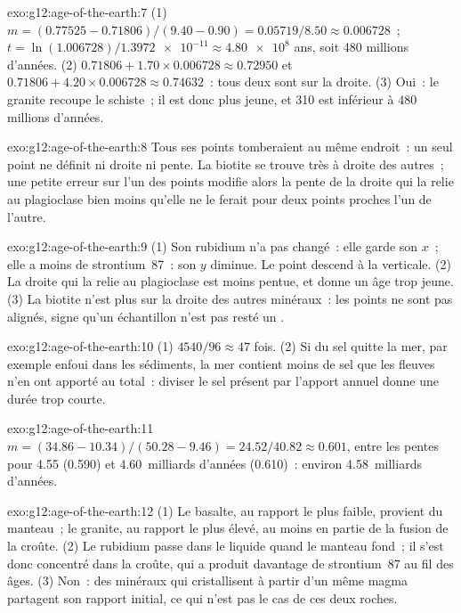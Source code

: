 \begin{solution}{exo:g12:age-of-the-earth:7}
(1) $m = (0.77525 - 0.71806)/(9.40 - 0.90) = 0.05719/8.50 \approx 0.006728$~;
$t = \ln(1.006728)/\num{1.3972e-11} \approx \num{4.80e8}$ ans, soit 480
millions d'années. (2) $0.71806 + 1.70 \times 0.006728 \approx 0.72950$ et $0.71806 + 4.20
\times 0.006728 \approx 0.74632$~: tous deux sont sur la droite. (3) Oui~:
le granite recoupe le schiste~; il est donc plus jeune, et 310 est
inférieur à 480 millions d'années.
\end{solution}

\begin{solution}{exo:g12:age-of-the-earth:8}
Tous ses points tomberaient au même endroit~: un seul point ne définit ni
droite ni pente. La biotite se trouve très à droite des autres~; une petite
erreur sur l'un des points modifie alors la pente de la droite qui la
relie au plagioclase bien moins qu'elle ne le ferait pour deux points
proches l'un de l'autre.
\end{solution}

\begin{solution}{exo:g12:age-of-the-earth:9}
(1) Son rubidium n'a pas changé~: elle garde son $x$~; elle a moins de
strontium~87~: son $y$ diminue. Le point descend à la verticale. (2) La
droite qui la relie au plagioclase est moins pentue, et donne un âge trop
jeune. (3) La biotite n'est plus sur la droite des autres minéraux~: les
points ne sont pas alignés, signe qu'un échantillon n'est pas resté un
.
\end{solution}

\begin{solution}{exo:g12:age-of-the-earth:10}
(1) $4540/96 \approx 47$ fois. (2) Si du sel quitte la mer, par exemple
enfoui dans les sédiments, la mer contient moins de sel que les fleuves
n'en ont apporté au total~: diviser le sel présent par l'apport annuel
donne une durée trop courte.
\end{solution}

\begin{solution}{exo:g12:age-of-the-earth:11}
$m = (34.86 - 10.34)/(50.28 - 9.46) = 24.52/40.82 \approx 0.601$, entre
les pentes pour 4.55 (0.590) et 4.60~milliards d'années (0.610)~: environ
4.58~milliards d'années.
\end{solution}

\begin{solution}{exo:g12:age-of-the-earth:12}
(1) Le basalte, au rapport le plus faible, provient du manteau~; le
granite, au rapport le plus élevé, au moins en partie de la fusion de la
croûte. (2) Le rubidium passe dans le liquide quand le manteau fond~; il
s'est donc concentré dans la croûte, qui a produit davantage de
strontium~87 au fil des âges. (3) Non~: des minéraux qui cristallisent à
partir d'un même magma partagent son rapport initial, ce qui n'est pas le
cas de ces deux roches.
\end{solution}

